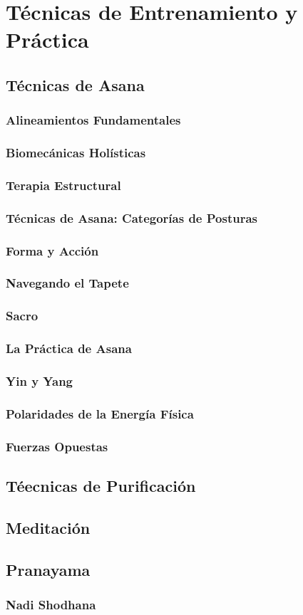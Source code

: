 \chapter{Técnicas de Entrenamiento y Práctica}
\section{Técnicas de Asana}
\subsection{Alineamientos Fundamentales}
\subsection{Biomecánicas Holísticas}
\subsection{Terapia Estructural}
\subsection{Técnicas de Asana: Categorías de Posturas}
\subsection{Forma y Acción}
\subsection{Navegando el Tapete}
\subsection{Sacro}
\subsection{La Práctica de Asana}
\subsection{Yin y Yang}
\subsection{Polaridades de la Energía Física}
\subsection{Fuerzas Opuestas}
\section{Téecnicas de Purificación}
\section{Meditación}
\section{Pranayama}
\subsection{Nadi Shodhana}


